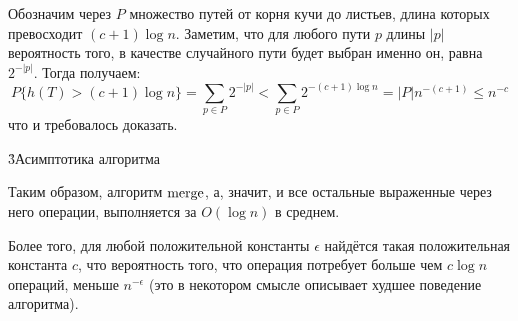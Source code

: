Обозначим через $P$ множество путей от корня кучи до листьев, длина которых превосходит $(c+1) \log n$. Заметим, что для любого пути $p$ длины $|p|$ вероятность того, в качестве случайного пути будет выбран именно он, равна $2^{-|p|}$. Тогда получаем:
$$ P\{ h(T) > (c+1) \log n \} = \sum_{p \in P} 2^{-|p|} < \sum_{p \in P} 2^{-(c+1) \log n} = |P| n^{-(c+1)} \le n^{-c} $$
что и требовалось доказать.

\h3{Асимптотика алгоритма}

Таким образом, алгоритм $\rm merge$, а, значит, и все остальные выраженные через него операции, выполняется за $O(\log n)$ в среднем.

Более того, для любой положительной константы $\epsilon$ найдётся такая положительная константа $c$, что вероятность того, что операция потребует больше чем $c \log n$ операций, меньше $n^{-\epsilon}$ (это в некотором смысле описывает худшее поведение алгоритма).